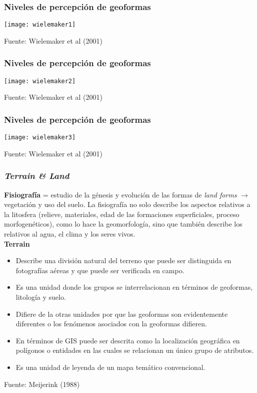 \documentclass{beamer}
\begin{document}
\begin{frame}
\frametitle{Niveles de percepción de geoformas}
\begin{center}
	\texttt{[image: wielemaker1]}
\end{center}
\tiny{Fuente: Wielemaker et al (2001)}
\end{frame}
\begin{frame}
\frametitle{Niveles de percepción de geoformas}
\begin{center}
	\texttt{[image: wielemaker2]}
\end{center}
\tiny{Fuente: Wielemaker et al (2001)}
\end{frame}
\begin{frame}
\frametitle{Niveles de percepción de geoformas}
\begin{center}
	\texttt{[image: wielemaker3]}
\end{center}
\tiny{Fuente: Wielemaker et al (2001)}
\end{frame}
\begin{frame}
\frametitle{\emph{Terrain \& Land}}
\small{
\textbf{Fisiografía} = estudio de la génesis y evolución de las formas de \emph{land forms} $\rightarrow$ vegetación y uso del suelo. La fisiografía no solo describe los aspectos relativos a la litosfera (relieve, materiales, edad de las formaciones superficiales, proceso morfogenéticos), como lo hace la geomorfología, sino que también describe los relativos al agua, el clima y los seres vivos.\\
\vspace{5pt}
\textbf{Terrain}
\begin{itemize}
\item Describe una división natural del terreno que puede ser distinguida en fotografías aéreas y que puede ser verificada en campo.\\
\item Es una unidad donde los grupos se interrelacionan en términos de geoformas, litología y suelo.\\
\item Difiere de la otras unidades por que las geoformas son evidentemente diferentes o los fenómenos asociados con la geoformas difieren.\
\item En términos de GIS puede ser descrita como la localización geográfica en polígonos o entidades en las cuales se relacionan un único grupo de atributos.\\
\item Es una unidad de leyenda de un mapa temático convencional.
\end{itemize}
}
\tiny{Fuente: Meijerink (1988)}
\end{frame}
\end{document}
